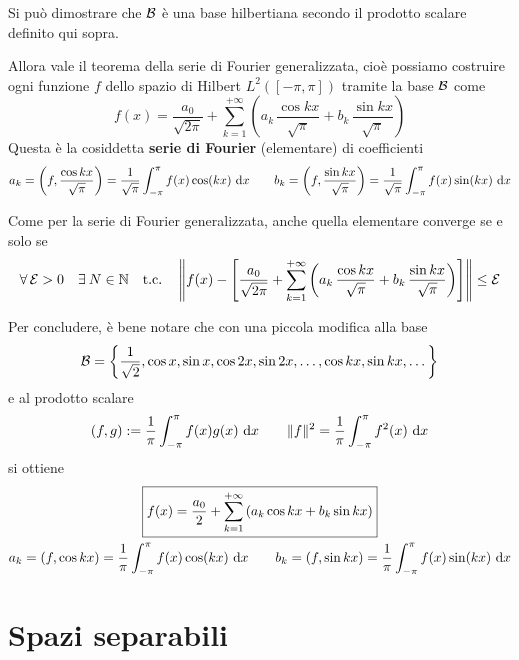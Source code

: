 Si può dimostrare che $\mathcal{B}$ è una base hilbertiana secondo il prodotto scalare definito qui sopra.

Allora vale il teorema della serie di Fourier generalizzata, cioè
possiamo costruire ogni funzione $f$ dello spazio di Hilbert $L^2\left([-\pi,\pi]\right)$ tramite la base $\mathcal{B}$ come 
\begin{equation*}
\boxed{f(x)=\frac{a_0}{\sqrt{2\pi}}+\sum_{k=1}^{+\infty}\left(a_k\,\frac{\cos kx}{\sqrt{\pi}}+b_k\,\frac{\sin kx}{\sqrt{\pi}}\right)}
\end{equation*}
Questa è la cosiddetta \textbf{serie di Fourier} (elementare) di coefficienti
\begin{equation*}
a_{k} =\left(f,\frac{\cos kx}{\sqrt{\pi}}\right) = \frac{1}{\sqrt{\pi}}\int^{\pi}_{- \pi} f(x)\cos(kx) \  \mathrm{d} x\qquad
b_{k} = \left(f,\frac{\sin kx}{\sqrt{\pi}}\right) = \frac{1}{\sqrt{\pi}}\int^{\pi}_{- \pi} f(x)\sin(kx) \  \mathrm{d} x
\end{equation*}

Come per la serie di Fourier generalizzata, anche quella elementare converge se e solo se
$$
\forall\Ec>0 \quad \exists N\in \NN \quad \text{t.c.}\quad \left\|f(x)-\left[\frac{a_0}{\sqrt{2\pi}}+\sum_{k=1}^{+\infty}\left(a_k\,\frac{\cos kx}{\sqrt{\pi}}+b_k\,\frac{\sin kx}{\sqrt{\pi}}\right)\right]\right\|\leq \Ec
$$

Per concludere, è bene notare che con una piccola modifica alla base
\begin{equation*}
\mathcal{B} = \left\{\frac{1}{\sqrt{2}}, \cos x, \sin x, \cos 2x, \sin 2x, \dotsc,\cos kx,\sin kx,\dotsc \right\}
\end{equation*}
e al prodotto scalare
\begin{equation*}
(f,g):=\frac{1}{\pi}\int_{-\pi}^\pi f(x)g(x)\  \mathrm{d} x \qquad \Vert f\Vert^2=\frac{1}{\pi}\int_{-\pi}^\pi f^2(x)\  \mathrm{d} x
\end{equation*}
si ottiene
\begin{gather*}
\boxed{f(x)=\frac{a_0}{2}+\sum_{k=1}^{+\infty}\left(a_k\cos kx+b_k\sin kx\right)} \\
a_{k} = (f, \cos kx) = \frac{1}{\pi}\int^{\pi}_{- \pi} f(x)\cos(kx) \  \mathrm{d} x\qquad
b_{k} = (f, \sin kx) = \frac{1}{\pi}\int^{\pi}_{- \pi} f(x)\sin(kx) \  \mathrm{d} x
\end{gather*}

\newpage

\section{Spazi separabili}

